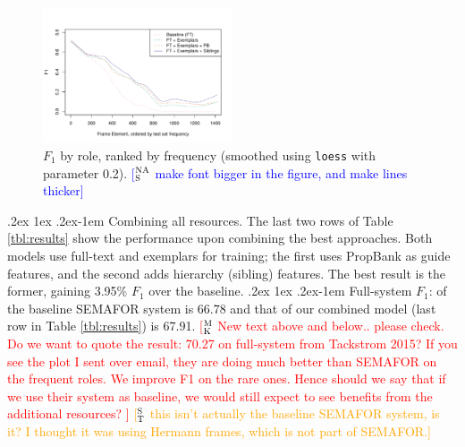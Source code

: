 \documentclass[11pt,a4paper]{article}
\makeatletter
\newcommand{\ensuretext}[1]{#1}
\newcommand{\mkmarker}{\ensuretext{\textcolor{red}{\ensuremath{^{\textsc{M}}_{\textsc{K}}}}}}
\newcommand{\stmarker}{\ensuretext{\textcolor{orange}{\ensuremath{^{\textsc{S}}_{\textsc{T}}}}}}
\newcommand{\nasmarker}{\ensuretext{\textcolor{blue}{\ensuremath{^{\textsc{NA}}_{\textsc{S}}}}}}
\newcommand{\arkcomment}[3]{\ensuretext{\textcolor{#3}{[#1 #2]}}}
\newcommand{\mk}[1]{\arkcomment{\mkmarker}{#1}{red}}
\newcommand{\st}[1]{\arkcomment{\stmarker}{#1}{orange}}
\newcommand{\nascomment}[1]{\arkcomment{\nasmarker}{#1}{blue}}
\renewcommand{\paragraph}{%
  \@startsection{paragraph}{4}%
  {\z@}{.2ex \@plus 1ex \@minus .2ex}{-1em}%
  {\normalfont\normalsize\bfseries}%
}
\makeatother
\begin{document}
\begin{figure}[t]
		\includegraphics[width=0.5\textwidth]{fig/f1_sorted_by_num_instances}
\caption{\label{fig:coolplot}$F_1$ by role, ranked by frequency
  (smoothed using \texttt{loess} with parameter 0.2). \nascomment{make
  font bigger in the figure, and make lines thicker}}
\end{figure}


\paragraph{Combining all resources.} The last two rows of Table
\ref{tbl:results} show the performance upon combining the best
approaches.  Both models use full-text and exemplars for training; the
first uses PropBank as guide features, and the second adds hierarchy (sibling) features.  
The best result is the former, gaining 3.95\% $F_1$ over the baseline.
\paragraph{Full-system $F_1$}: of the baseline SEMAFOR system is 
66.78 and that of our combined model (last row in Table \ref{tbl:results}) is 67.91.
\mk{New text above and below.. please check. Do we want to quote the result: 70.27 on full-system 
from Tackstrom 2015? If you see the plot I sent over email, they
are doing much better than SEMAFOR on the frequent roles. We improve F1 on the rare ones.
Hence should we say that if we use their system as baseline, we would still
expect to see benefits from the additional resources? }
\st{this isn't actually the baseline SEMAFOR system, is it? I thought it was
using Hermann frames, which is not part of SEMAFOR.}
\end{document}
